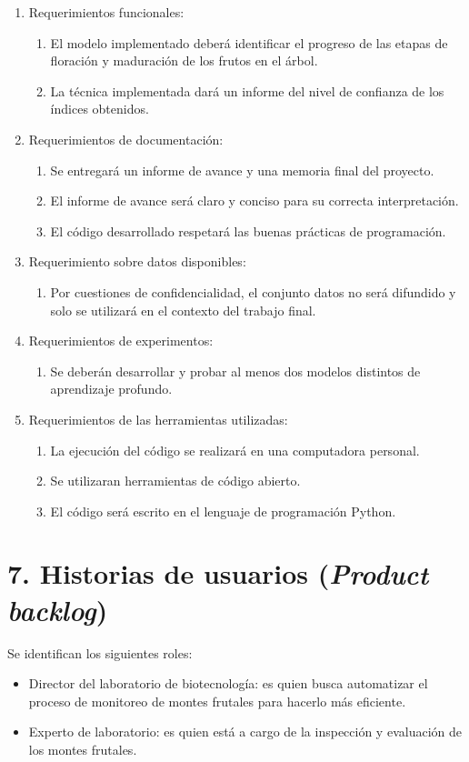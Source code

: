 \documentclass[
11pt, %
]{charter}
\begin{document}
\begin{enumerate}
	\item Requerimientos funcionales:
		\begin{enumerate}
			\item El modelo implementado deberá identificar el progreso de las etapas de floración y maduración de los frutos en el árbol.
			\item La técnica implementada dará un informe del nivel de confianza de los índices obtenidos.
		\end{enumerate}
	\item Requerimientos de documentación:
		\begin{enumerate}
			\item Se entregará un informe de avance y una memoria final del proyecto.
			\item El informe de avance será claro y conciso para su correcta interpretación.
			\item El código desarrollado respetará las buenas prácticas de programación.
		\end{enumerate}
	\item Requerimiento sobre datos disponibles:
	\begin{enumerate}
        \item Por cuestiones de confidencialidad, el conjunto datos no será difundido y solo se utilizará
        en el contexto del trabajo final.
    \end{enumerate}
    \item Requerimientos de experimentos:
	\begin{enumerate}
        \item Se deberán desarrollar y probar al menos dos modelos distintos de aprendizaje profundo.
    \end{enumerate}
    \item Requerimientos de las herramientas utilizadas:
	\begin{enumerate}
        \item La ejecución del código se realizará en una computadora personal.
        \item Se utilizaran herramientas de código abierto.
        \item El código será escrito en el lenguaje de programación Python.
    \end{enumerate}
\end{enumerate}



\section{7. Historias de usuarios (\textit{Product backlog})}
\label{sec:backlog}
Se identifican los siguientes roles:
\begin{itemize}
    \item Director del laboratorio de biotecnología: es quien busca automatizar el proceso de monitoreo de
    montes frutales para hacerlo más eficiente.
    \item Experto de laboratorio: es quien está a cargo de la inspección y evaluación de los montes frutales.
\end{itemize}
\end{document}
